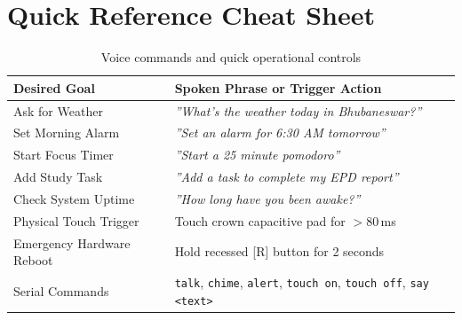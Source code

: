 \documentclass[11pt,a4paper,oneside]{report}
\newcommand{\hdr}[1]{\cellcolor{LightBlue}\textbf{#1}}
\newcommand{\ui}[1]{\textsf{#1}}
\begin{document}
\appendix
\chapter{Quick Reference Cheat Sheet}
\begin{table}[H]\centering\small
\caption{Voice commands and quick operational controls}
\begin{tabularx}{\linewidth}{|l|X|}\hline
\hdr{Desired Goal} & \hdr{Spoken Phrase or Trigger Action}\\ \hline
Ask for Weather & \emph{''What's the weather today in Bhubaneswar?''} \\ \hline
Set Morning Alarm & \emph{''Set an alarm for 6:30 AM tomorrow''} \\ \hline
Start Focus Timer & \emph{''Start a 25 minute pomodoro''} \\ \hline
Add Study Task & \emph{''Add a task to complete my EPD report''} \\ \hline
Check System Uptime & \emph{''How long have you been awake?''} \\ \hline
Physical Touch Trigger & Touch crown capacitive pad for $>$80\,ms \\ \hline
Emergency Hardware Reboot & Hold recessed \ui{[R]} button for 2 seconds \\ \hline
Serial Commands & \texttt{talk}, \texttt{chime}, \texttt{alert}, \texttt{touch on}, \texttt{touch off}, \texttt{say <text>} \\ \hline
\end{tabularx}
\end{table}
\end{document}
